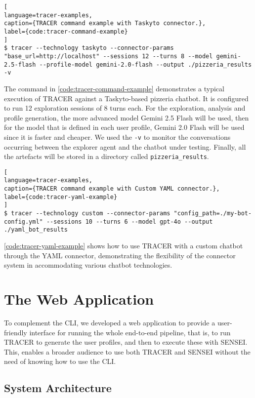 \begin{lstlisting}[
language=tracer-examples,
caption={TRACER command example with Taskyto connector.},
label={code:tracer-command-example}
]
$ tracer --technology taskyto --connector-params "base_url=http://localhost" --sessions 12 --turns 8 --model gemini-2.5-flash --profile-model gemini-2.0-flash --output ./pizzeria_results -v
\end{lstlisting}

The command in \autoref{code:tracer-command-example}
demonstrates a typical execution of \ac{TRACER} against a Taskyto-based pizzeria chatbot.
It is configured to run 12 exploration sessions of 8 turns each.
For the exploration, analysis and profile generation,
the more advanced model Gemini 2.5 Flash will be used,
then for the model that is defined in each user profile, Gemini 2.0 Flash will be used since it is faster and cheaper.
We used the \texttt{-v} to monitor the conversations occurring
between the explorer agent and the chatbot under testing.
Finally, all the artefacts will be stored in a directory called \texttt{pizzeria\_results}.

\begin{lstlisting}[
language=tracer-examples,
caption={TRACER command example with Custom YAML connector.},
label={code:tracer-yaml-example}
]
$ tracer --technology custom --connector-params "config_path=./my-bot-config.yml" --sessions 10 --turns 6 --model gpt-4o --output ./yaml_bot_results
\end{lstlisting}

\autoref{code:tracer-yaml-example} shows how to use \ac{TRACER}
with a custom chatbot through the YAML connector,
demonstrating the flexibility of the connector system
in accommodating various chatbot technologies.

\section{The Web Application}

To complement the \ac{CLI},
we developed a web application
to provide a user-friendly interface for running the whole end-to-end pipeline,
that is, to run \ac{TRACER} to generate the user profiles,
and then to execute these with SENSEI.
This, enables a broader audience to use both \ac{TRACER} and SENSEI
without the need of knowing how to use the \ac{CLI}.

\subsection{System Architecture}

